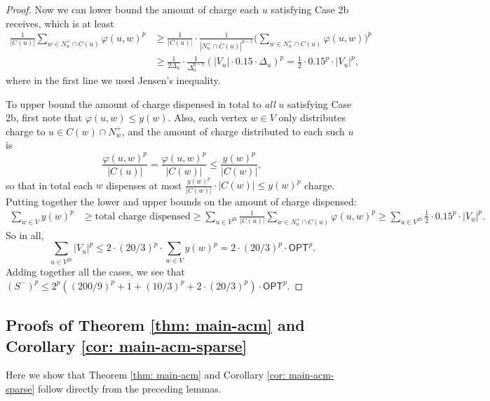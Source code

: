 \documentclass[11pt]{article}
\begin{document}
\begin{proof}
    Now we can lower bound the amount of charge each $u$ satisfying Case 2b receives, which is at least
    \begin{align*}
    \frac{1}{|C(u)|} \sum_{w \in N_u^+ \cap C(u)} \varphi(u,w)^p &\geq \frac{1}{|C(u)|} \cdot \frac{1}{|N_u^+ \cap C(u)|^{p-1}} \Big(\sum_{w \in N_u^+ \cap C(u)} \varphi(u,w) \Big)^p \\
    &\geq \frac{1}{2\Delta_u} \cdot \frac{1}{\Delta_u^{p-1}} \left(|V_u| \cdot 0.15\cdot \Delta_u \right)^p 
    = \frac{1}{2} \cdot 0.15^p \cdot |V_u|^p,
    \end{align*}
    where in the first line we used Jensen's inequality. 

    To upper bound the amount of charge dispensed in total to \textit{all} $u$ satisfying Case 2b, first note that $\varphi(u,w) \leq y(w)$. Also, each vertex $w \in V$ only distributes charge to $u \in C(w) \cap N_w^+$, and the amount of charge distributed to each such $u$ is 
    $$\frac{\varphi(u,w)^p}{|C(u)|} = \frac{\varphi(u,w)^p}{|C(w)|} \leq \frac{y(w)^p}{|C(w)|},$$
    so that in total each $w$ dispenses at most 
    $\frac{y(w)^p}{|C(w)|} \cdot |C(w)| \leq y(w)^p$ 
 charge. Putting together the lower and upper bounds on the amount of charge dispensed:
 \begin{align*}
     \sum_{w \in V} y(w)^p &\geq \text{total charge dispensed} 
     \geq \sum_{u \in V^{2b}} \frac{1}{|C(u)|} \sum_{w \in N_u^+ \cap C(u)} \varphi(u,w)^p 
     \geq \sum_{u \in V^{2b}} \frac{1}{2} \cdot 0.15^p \cdot |V_u|^p.
 \end{align*}
 So in all,
 \[\boxed{\sum_{u \in V^{2b}} |V_u|^p \leq 2 \cdot (20/3)^p \cdot \sum_{w \in V} y(w)^p = 2 \cdot (20/3)^p \cdot \textsf{OPT}^p.}\]
Adding together all the cases, we see that
$ (S^-)^p\leq 
2^p ((200/9)^p+1+(10/3)^p+2\cdot (20/3)^p)\cdot \textsf{OPT}^p.
$
 \end{proof}

 \subsection{Proofs of Theorem \ref{thm: main-acm} and Corollary {\ref{cor: main-acm-sparse}}} \label{sec: thm1_proof}

Here we show that Theorem \ref{thm: main-acm} and Corollary \ref{cor: main-acm-sparse} follow directly from the preceding lemmas. 
\end{document}
